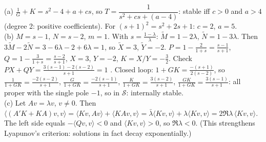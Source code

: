 \begin{solbox}[title={M5 solutions}]
(a) $\frac1G+K=s^2-4+a+cs$, so $T=\dfrac{1}{s^2+cs+(a-4)}$: stable iff $c>0$ and $a>4$ (degree 2: positive coefficients). For $(s+1)^2=s^2+2s+1$: $c=2$, $a=5$.\\[1mm]
(b) $M=s-1$, $N=s-2$, $m=1$. With $s=\frac{1-\lambda}\lambda$: $\tilde M=1-2\lambda$, $\tilde N=1-3\lambda$. Then $3\tilde M-2\tilde N=3-6\lambda-2+6\lambda=1$, so $\tilde X=3$, $\tilde Y=-2$.
$P=1-\frac{2}{1+s}=\frac{s-1}{s+1}$, $Q=1-\frac3{1+s}=\frac{s-2}{s+1}$, $X=3$, $Y=-2$, $K=X/Y=-\frac32$.
Check $PX+QY=\frac{3(s-1)-2(s-2)}{s+1}=1$ \checkmark. Closed loop: $1+GK=\frac{-(s+1)}{2(s-2)}$, so
$\frac1{1+GK}=\frac{-2(s-2)}{s+1}$, $\frac{G}{1+GK}=\frac{-2(s-1)}{s+1}$, $\frac{K}{1+GK}=\frac{3(s-2)}{s+1}$, $\frac{GK}{1+GK}=\frac{3(s-1)}{s+1}$: all proper with the single pole $-1$, so in $\mathcal S$: internally stable.\\[1mm]
(c) Let $Av=\lambda v$, $v\neq0$. Then
$\langle(A'K+KA)v,v\rangle=\langle Kv,Av\rangle+\langle KAv,v\rangle=\bar\lambda\langle Kv,v\rangle+\lambda\langle Kv,v\rangle=2\Re\lambda\,\langle Kv,v\rangle$.
The left side equals $-\langle Qv,v\rangle<0$ and $\langle Kv,v\rangle>0$, so $\Re\lambda<0$. (This strengthens Lyapunov's criterion: solutions in fact decay exponentially.)
\end{solbox}


